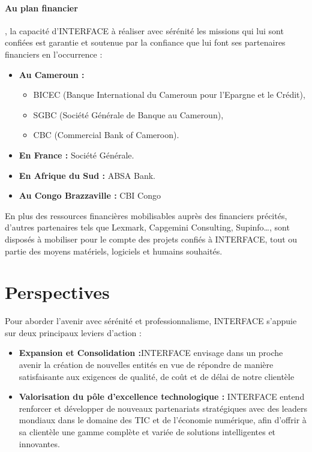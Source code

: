 \paragraph{Au plan financier}, la capacité d’INTERFACE à réaliser avec sérénité les missions qui lui sont confiées est garantie et soutenue par la confiance que lui font ses partenaires financiers en l’occurrence :
\begin{itemize}
    \item \textbf{Au Cameroun :}
    \begin{itemize}
        \item BICEC (Banque International du Cameroun pour l’Epargne et le Crédit),
        \item SGBC (Société Générale de Banque au Cameroun),
        \item CBC (Commercial Bank of Cameroon).
    \end{itemize}
    \item \textbf{En France :} Société Générale.
    \item \textbf{En Afrique du Sud :} ABSA Bank.
    \item \textbf{Au Congo Brazzaville :} CBI Congo
\end{itemize}

En plus des ressources financières mobilisables auprès des financiers précités, d’autres partenaires tels que Lexmark, Capgemini Consulting, Supinfo…, sont disposés à mobiliser pour le compte des projets confiés à INTERFACE, tout ou partie des moyens matériels, logiciels et humains souhaités.

\section{Perspectives}
Pour aborder l’avenir avec sérénité et professionnalisme, INTERFACE s’appuie sur deux principaux leviers d’action :
\begin{itemize}
    \item \textbf{Expansion et Consolidation :}INTERFACE envisage dans un proche avenir la création de nouvelles entités en vue de répondre de manière satisfaisante aux exigences de qualité, de coût et de délai de notre clientèle
    \item \textbf{Valorisation du pôle d’excellence technologique :} INTERFACE entend renforcer et développer de nouveaux partenariats stratégiques avec des leaders mondiaux dans le domaine des TIC et de l’économie numérique, afin d’offrir à sa clientèle une gamme complète et variée de solutions intelligentes et innovantes.
\end{itemize}  


